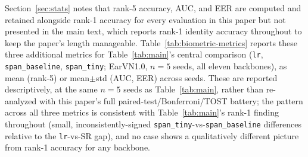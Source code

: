\documentclass[pdflatex,sn-vancouver-num]{sn-jnl}
\begin{document}
Section~\ref{sec:stats} notes that rank-5 accuracy, AUC, and EER are computed and retained alongside rank-1 accuracy for every evaluation in this paper but not presented in the main text, which reports rank-1 identity accuracy throughout to keep the paper's length manageable. Table~\ref{tab:biometric-metrics} reports these three additional metrics for Table~\ref{tab:main}'s central comparison (\texttt{lr}, \texttt{span\_baseline}, \texttt{span\_tiny}; EarVN1.0, $n=5$ seeds, all eleven backbones), as mean (rank-5) or mean$\pm$std (AUC, EER) across seeds. These are reported descriptively, at the same $n=5$ seeds as Table~\ref{tab:main}, rather than re-analyzed with this paper's full paired-test/Bonferroni/TOST battery; the pattern across all three metrics is consistent with Table~\ref{tab:main}'s rank-1 finding throughout (small, inconsistently-signed \texttt{span\_tiny}-vs-\texttt{span\_baseline} differences relative to the \texttt{lr}-vs-SR gap), and no case shows a qualitatively different picture from rank-1 accuracy for any backbone.
\end{document}
